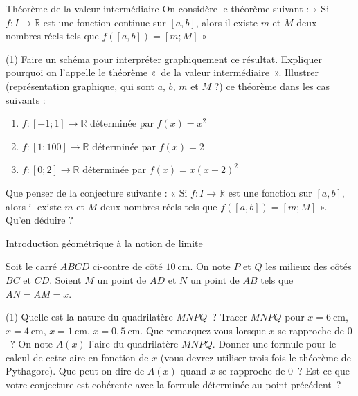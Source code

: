 \documentclass[a4paper,12pt]{article}
\begin{document}
\begin{activite}[label=acti:valint]{Théorème de la valeur intermédiaire}
\tcblower
On considère le théorème suivant : « Si $f: I \to \mathbb{R}$ est une fonction continue sur $[a,b]$, alors il existe $m$ et $M$ deux nombres réels tels que $f([a,b]) = [m;M]$ »

\begin{tasks}(1)
\task Faire un schéma pour interpréter graphiquement ce résultat.
\task Expliquer pourquoi on l'appelle le théorème «~de la valeur intermédiaire~».
\task Illustrer (représentation graphique, qui sont $a$, $b$, $m$ et $M$ ?) ce théorème dans les cas suivants :
\begin{enumerate}
\item $f:[-1;1] \to \mathbb{R}$ déterminée par $f(x) = x^2$
\item $f:[1;100] \to \mathbb{R}$ déterminée par $f(x) = 2$
\item $f:[0;2] \to \mathbb{R}$ déterminée par $f(x) = x(x-2)^2$
\end{enumerate}
\task Que penser de la conjecture suivante : « Si $f: I \to \mathbb{R}$ est une fonction sur $[a,b]$, alors il existe $m$ et $M$ deux nombres réels tels que $f([a,b]) = [m;M]$ ». Qu'en déduire ?
\end{tasks}
\end{activite}

\begin{activite}[label=acti:introLimGeom]
Introduction géométrique à la notion de limite	

	\tcblower
	Soit le carré $ABCD$ ci-contre de côté $10~\text{cm}$. On note $P$ et $Q$ les milieux des côtés $BC$ et $CD$. Soient $M$ un point de $AD$ et $N$ un point de $AB$ tels que $\overline{AN}=\overline{AM}=x$.
	\begin{tasks}(1)
		\task Quelle est la nature du quadrilatère $MNPQ$~?
		\task Tracer $MNPQ$ pour $x=6~\text{cm}$, $x=4~\text{cm}$, $x=1~\text{cm}$, $x=0,5~\text{cm}$.
		\task Que remarquez-vous lorsque $x$ se rapproche de $0$~?
		\task On note $A(x)$ l'aire du quadrilatère $MNPQ$. Donner une formule pour le calcul de cette aire en fonction de $x$ (vous devrez utiliser trois fois le théorème de Pythagore). 
		\task Que peut-on dire de $A(x)$ quand $x$ se rapproche de $0$~? Est-ce que votre conjecture est cohérente avec la formule déterminée au point précédent~?
	\end{tasks}
\end{activite}
\end{document}
